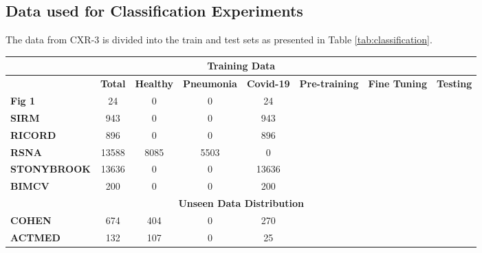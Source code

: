 \documentclass[10pt,journal,compsoc]{IEEEtran}
\newcommand{\cmark}{\ding{51}}\newcommand{\xmark}{\ding{55}}
\begin{document}
\subsection{Data used for Classification Experiments}\label{section:dataset-clf}
The data from CXR-3 is divided into the train and test sets as presented in Table \ref{tab:classification}.  
\begin{table*}[ht]
\setlength\tabcolsep{1pt}
\caption{\textbf{Classification Data Overview}. Table showing the counts of CXR images in each of the datasets that have been used for the classification-related tasks in this paper. The table also shows the various stages for which the dataset has been used like pre-training, fine-tuning, and testing. }
\label{tab:classification}
\begin{center}
{\small \begin{tabular}{|l|c|c|c|c|c|c|c|}
\hline 
\multicolumn{8}{|c|}{\textbf{Training Data}}                              \\ \hline \hline
 & \textbf{Total} & \textbf{Healthy} & \textbf{Pneumonia} & \textbf{Covid-19} & \textbf{Pre-training} & \textbf{Fine Tuning} & \textbf{Testing} \\ \hline \hline

\textbf{Fig 1}       & 24    & 0    & 0    & 24    & \cmark & \cmark & \xmark  \\
\textbf{SIRM}       & 943   & 0    & 0    & 943   & \cmark & \cmark & \xmark  \\
\textbf{RICORD}     & 896   & 0    & 0    & 896   & \cmark & \cmark & \xmark  \\
\textbf{RSNA}       & 13588 & 8085 & 5503 & 0     & \cmark & \cmark & \xmark  \\
\textbf{STONYBROOK} & 13636 & 0    & 0    & 13636 & \cmark & \cmark & \xmark  \\
\textbf{BIMCV}      & 200   & 0    & 0    & 200   & \cmark & \cmark & \xmark  \\ \hline \hline

\multicolumn{8}{|c|}{\textbf{Unseen Data Distribution}}                              \\ \hline \hline
\textbf{COHEN}      & 674   & 404  & 0    & 270   & \xmark  & \xmark  & \cmark \\
\textbf{ACTMED}     & 132   & 107  & 0    & 25    & \xmark  & \xmark  & \cmark  \\ \hline


\end{tabular}}
\end{center}
\end{table*}
\end{document}
